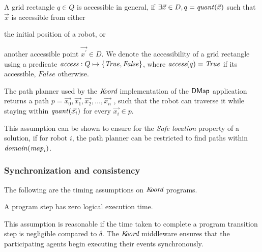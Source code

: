 A grid rectangle $q\in Q$ is accessible in general, if $\exists \Vec{x}\in D, q = \mathit{quant}(\Vec{x})$ such that $\Vec{x}$ is accessible from either

\begin{inparaenum} [(a)]
    \item the initial position of a robot, or
    \item another accessible point $\Vec{x^\prime}\in D$.
          We denote the accessibility of a grid rectangle using a predicate $\mathit{access} : Q \mapsto \left\{\mathit{True}, \mathit{False}\right\}$,
          where $\mathit{access}(q) = \mathit{True}$ if its accessible, $\mathit{False}$ otherwise.
\end{inparaenum}

\begin{assumption}
    The path planner used by the $\emph{K\kern-2pt oord}$ implementation of the ${\sf DMap}$ application returns a path $p = \Vec{x_0},\Vec{x_1}, \Vec{x_2},\ldots, \Vec{x_n}$ , such that the robot can traverse it while staying within $\mathit{quant}(\Vec{x_i})$ for every $\Vec{x_i}\in p$.
\end{assumption}

This assumption can be shown to ensure for the \emph{Safe location} property of a solution, if for robot $i$, the path planner can be restricted to find paths within $\mathit{domain}(\mathit{map}_i)$.




\subsubsection{Synchronization and consistency}
The following are the timing assumptions on $\emph{K\kern-2pt oord}$ programs.
\begin{assumption} A program step has zero logical execution time.
\end{assumption}
This assumption is reasonable if the time taken to complete a program transition step is negligible compared to $\delta$.  The $\emph{K\kern-2pt oord}$ middleware ensures that the participating agents begin executing their events synchronously.

